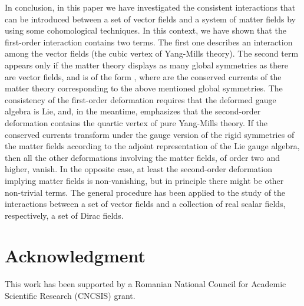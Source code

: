 \documentclass[a4paper,12pt]{article}
\begin{document}
In conclusion, in this paper we
have investigated the consistent
interactions that can be introduced
between a set of vector fields and a
system of matter fields by using some
cohomological techniques. In this
context, we have shown that the
first-order interaction contains two terms.
The first one describes an interaction
among the vector fields (the cubic
vertex of Yang-Mills theory). The
second term appears only if the matter
theory displays as many global
symmetries as there are vector fields, and is
of the form \coordHE{},
where \coordHE{} are the
conserved currents of the matter theory
corresponding to the above mentioned
global symmetries. The consistency of
the first-order deformation requires
that the deformed gauge algebra is Lie,
and, in the meantime, emphasizes
that the second-order deformation
contains the quartic vertex of pure
Yang-Mills theory. If the conserved
currents \coordHE{} transform
under the gauge version of the rigid
symmetries of the matter fields
according to the adjoint representation
of the Lie gauge algebra, then all
the other deformations involving the matter
fields, of order two and higher,
vanish. In the opposite case, at least the
second-order deformation implying
matter fields is non-vanishing, but in
principle there might be other
non-trivial terms. The general procedure
has been applied to the study of
the interactions between a set of vector
fields and a collection of real
scalar fields, respectively, a set
of Dirac fields.

\section*{Acknowledgment}

This work has been supported by a Romanian
National Council for Academic
Scientific Research (CNCSIS) grant.
\end{document}

